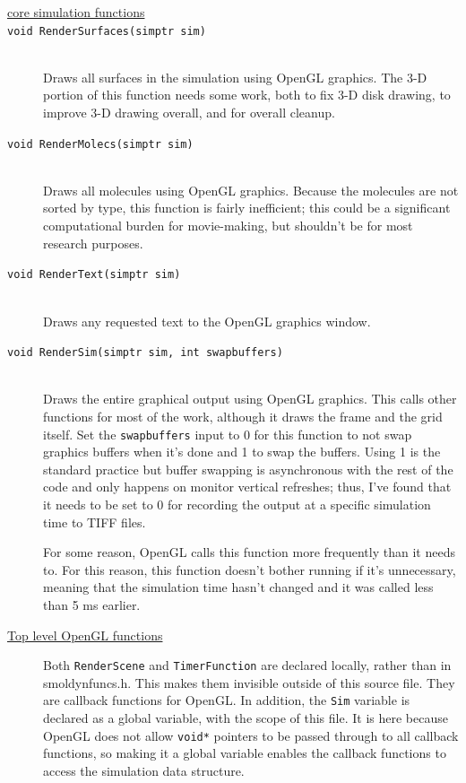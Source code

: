 \documentclass {scrbook}
\newcommand {\ttt} {\texttt}
\begin{document}
\begin{description}
\item[\underline{core simulation functions}]

\item[\ttt{void RenderSurfaces(simptr sim)}]
\hfill \\
Draws all surfaces in the simulation using OpenGL graphics. The 3-D portion of this function needs some work, both to fix 3-D disk drawing, to improve 3-D drawing overall, and for overall cleanup.

\item[\ttt{void RenderMolecs(simptr sim)}]
\hfill \\
Draws all molecules using OpenGL graphics. Because the molecules are not sorted by type, this function is fairly inefficient; this could be a significant computational burden for movie-making, but shouldn't be for most research purposes.

\item[\ttt{void RenderText(simptr sim)}]
\hfill \\
Draws any requested text to the OpenGL graphics window.

\item[\ttt{void RenderSim(simptr sim, int swapbuffers)}]
\hfill \\
Draws the entire graphical output using OpenGL graphics. This calls other functions for most of the work, although it draws the frame and the grid itself. Set the \ttt{swapbuffers} input to 0 for this function to not swap graphics buffers when it's done and 1 to swap the buffers. Using 1 is the standard practice but buffer swapping is asynchronous with the rest of the code and only happens on monitor vertical refreshes; thus, I've found that it needs to be set to 0 for recording the output at a specific simulation time to TIFF files.

For some reason, OpenGL calls this function more frequently than it needs to. For this reason, this function doesn't bother running if it's unnecessary, meaning that the simulation time hasn't changed and it was called less than 5 ms earlier.

\item[\underline{Top level OpenGL functions}]

Both \ttt{RenderScene} and \ttt{TimerFunction} are declared locally, rather than in smoldynfuncs.h. This makes them invisible outside of this source file. They are callback functions for OpenGL. In addition, the \ttt{Sim} variable is declared as a global variable, with the scope of this file. It is here because OpenGL does not allow \ttt{void*} pointers to be passed through to all callback functions, so making it a global variable enables the callback functions to access the simulation data structure.


\end{description}
\end{document}
